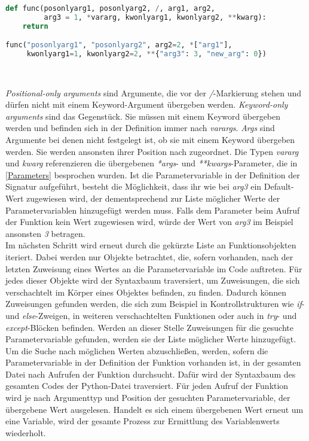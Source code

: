 \documentclass[german,bachelor]{swsLeipzig}
\begin{document}
\begin{lstlisting}[language=Python, frame=single, basicstyle=\small]
def func(posonlyarg1, posonlyarg2, /, arg1, arg2,
         arg3 = 1, *vararg, kwonlyarg1, kwonlyarg2, **kwarg):
    return

func("posonlyarg1", "posonlyarg2", arg2=2, *["arg1"],
     kwonlyarg1=1, kwonlyarg2=2, **{"arg3": 3, "new_arg": 0})
\end{lstlisting}
\

\textit{Positional-only arguments} sind Argumente, die vor der \textit{/}-Markierung stehen und dürfen nicht mit einem
Keyword-Argument übergeben werden.
\textit{Keyword-only arguments} sind das Gegenstück.
Sie müssen mit einem Keyword übergeben werden und befinden sich in der Definition immer nach \textit{varargs}.
\textit{Args} sind Argumente bei denen nicht festgelegt ist, ob sie mit einem Keyword übergeben werden.
Sie werden ansonsten ihrer Position nach zugeordnet.
Die Typen \textit{vararg} und \textit{kwarg} referenzieren die übergebenen \textit{*args}- und \textit{**kwargs}-Parameter,
die in \ref{Parameters} besprochen wurden.
Ist die Parametervariable in der Definition der Signatur aufgeführt, besteht die Möglichkeit, dass ihr wie bei \textit{arg3} ein Default-Wert
zugewiesen wird, der dementsprechend zur Liste möglicher Werte der Parametervariablen hinzugefügt werden muss.
Falls dem Parameter beim Aufruf der Funktion kein Wert zugewiesen wird, würde der Wert von \textit{arg3} im Beispiel ansonsten
\textit{3} betragen.\\

Im nächsten Schritt wird erneut durch die gekürzte Liste an Funktionsobjekten iteriert.
Dabei werden nur Objekte betrachtet, die, sofern vorhanden, nach der letzten Zuweisung eines Wertes an die
Parametervariable im Code auftreten.
Für jedes dieser Objekte wird der Syntaxbaum traversiert, um Zuweisungen, die sich verschachtelt im Körper eines Objektes
befinden, zu finden.
Dadurch können Zuweisungen gefunden werden, die sich zum Beispiel in Kontrollstrukturen wie \textit{if}- und \textit{else}-Zweigen,
in weiteren verschachtelten Funktionen oder auch in \textit{try}- und \textit{except}-Blöcken befinden.
Werden an dieser Stelle Zuweisungen für die gesuchte Parametervariable gefunden, werden sie der Liste möglicher Werte hinzugefügt. \\

Um die Suche nach möglichen Werten abzuschließen, werden, sofern die Parametervariable in der Definition der Funktion vorhanden ist,
in der gesamten Datei nach Aufrufen der Funktion durchsucht.
Dafür wird der Syntaxbaum des gesamten Codes der Python-Datei traversiert.
Für jeden Aufruf der Funktion wird je nach Argumenttyp und Position der gesuchten Parametervariable, der übergebene
Wert ausgelesen.
Handelt es sich einem übergebenen Wert erneut um eine Variable, wird der gesamte Prozess zur Ermittlung des Variablenwerts wiederholt. \\
\end{document}
